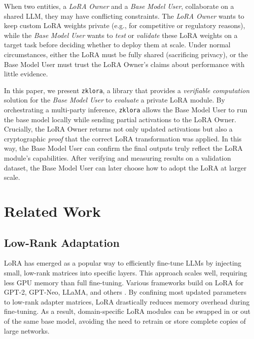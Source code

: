 \documentclass[11pt]{article}
\begin{document}
When two entities, a \emph{LoRA Owner} and a \emph{Base Model User}, collaborate on a shared LLM, they may have conflicting constraints. The \emph{LoRA Owner} wants to keep custom LoRA weights private (e.g., for competitive or regulatory reasons), while the \emph{Base Model User} wants to \emph{test} or \emph{validate} these LoRA weights on a target task before deciding whether to deploy them at scale. Under normal circumstances, either the LoRA must be fully shared (sacrificing privacy), or the Base Model User must trust the LoRA Owner’s claims about performance with little evidence.

In this paper, we present \texttt{zklora}, a library that provides a \emph{verifiable computation} solution for the \emph{Base Model User} to \emph{evaluate} a private LoRA module. By orchestrating a multi-party inference, \texttt{zklora} allows the Base Model User to run the base model locally while sending partial activations to the LoRA Owner. Crucially, the LoRA Owner returns not only updated activations but also a cryptographic \emph{proof} that the correct LoRA transformation was applied. In this way, the Base Model User can confirm the final outputs truly reflect the LoRA module’s capabilities. After verifying and measuring results on a validation dataset, the Base Model User can later choose how to adopt the LoRA at larger scale.

\section{Related Work}

\subsection{Low-Rank Adaptation}
LoRA \cite{hu2021lora} has emerged as a popular way to efficiently fine-tune LLMs by injecting small, low-rank matrices into specific layers. This approach scales well, requiring less GPU memory than full fine-tuning. Various frameworks build on LoRA for GPT-2, GPT-Neo, LLaMA, and others \cite{ding2022delta}. By confining most updated parameters to low-rank adapter matrices, LoRA drastically reduces memory overhead during fine-tuning. As a result, domain-specific LoRA modules can be swapped in or out of the same base model, avoiding the need to retrain or store complete copies of large networks.
\end{document}
